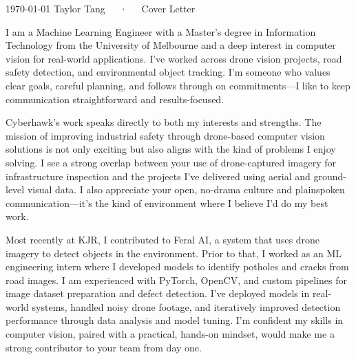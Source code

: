 \documentclass[11pt, a4paper]{awesome-cv}
\begin{document}
\makecvheader[R]

\makecvfooter
  {\today}
  {Taylor Tang~~~·~~~Cover Letter}
  {}

\makelettertitle

\begin{cvletter}

I am a Machine Learning Engineer with a Master’s degree in Information Technology from the University of Melbourne and a deep interest in computer vision for real-world applications. I’ve worked across drone vision projects, road safety detection, and environmental object tracking. I’m someone who values clear goals, careful planning, and follows through on commitments—I like to keep communication straightforward and results-focused.

Cyberhawk’s work speaks directly to both my interests and strengths. The mission of improving industrial safety through drone-based computer vision solutions is not only exciting but also aligns with the kind of problems I enjoy solving. I see a strong overlap between your use of drone-captured imagery for infrastructure inspection and the projects I’ve delivered using aerial and ground-level visual data. I also appreciate your open, no-drama culture and plainspoken communication—it’s the kind of environment where I believe I’d do my best work.

Most recently at KJR, I contributed to Feral AI, a system that uses drone imagery to detect objects in the environment. Prior to that, I worked as an ML engineering intern where I developed models to identify potholes and cracks from road images. I am experienced with PyTorch, OpenCV, and custom pipelines for image dataset preparation and defect detection. I’ve deployed models in real-world systems, handled noisy drone footage, and iteratively improved detection performance through data analysis and model tuning. I’m confident my skills in computer vision, paired with a practical, hands-on mindset, would make me a strong contributor to your team from day one.

\end{cvletter}


\makeletterclosing
\end{document}
